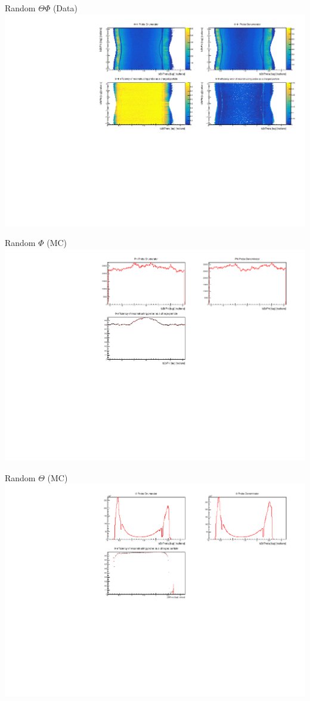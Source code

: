 \documentclass[10pt]{beamer}
\begin{document}
\begin{frame}{Random $\Theta \Phi$ (Data)}
	\centering
	\includegraphics[width=\textwidth]{Additional/RandomTP_Data}
\end{frame}

\begin{frame}{Random $\Phi$ (MC)}
	\centering
	\includegraphics[width=\textwidth]{Additional/RandomPhi_MC}
\end{frame}

\begin{frame}{Random $\Theta$ (MC)}
	\centering
	\includegraphics[width=\textwidth]{Additional/RandomTheta_MC}
\end{frame}
\end{document}
